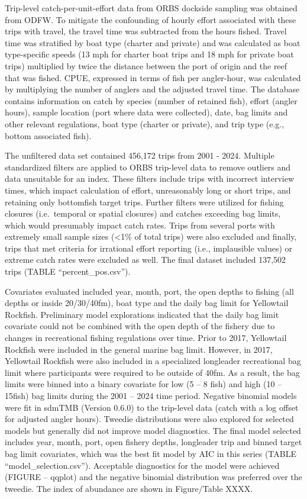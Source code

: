 \documentclass[
]{scrartcl}
\begin{document}
Trip-level catch-per-unit-effort data from ORBS dockside sampling was
obtained from ODFW. To mitigate the confounding of hourly effort
associated with these trips with travel, the travel time was subtracted
from the hours fished. Travel time was stratified by boat type (charter
and private) and was calculated as boat type-specific speeds (13 mph for
charter boat trips and 18 mph for private boat trips) multiplied by
twice the distance between the port of origin and the reef that was
fished. CPUE, expressed in terms of fish per angler-hour, was calculated
by multiplying the number of anglers and the adjusted travel time. The
database contains information on catch by species (number of retained
fish), effort (angler hours), sample location (port where data were
collected), date, bag limits and other relevant regulations, boat type
(charter or private), and trip type (e.g., bottom associated fish).

The unfiltered data set contained 456,172 trips from 2001 - 2024.
Multiple standardized filters are applied to ORBS trip-level data to
remove outliers and data unsuitable for an index. These filters include
trips with incorrect interview times, which impact calculation of
effort, unreasonably long or short trips, and retaining only bottomfish
target trips. Further filters were utilized for fishing closures
(i.e.~temporal or spatial closures) and catches exceeding bag limits,
which would presumably impact catch rates. Trips from several ports with
extremely small sample sizes (\textless1\% of total trips) were also
excluded and finally, trips that met criteria for irrational effort
reporting (i.e., implausible values) or extreme catch rates were
excluded as well. The final dataset included 137,502 trips (TABLE
``percent\_pos.csv'').

Covariates evaluated included year, month, port, the open depths to
fishing (all depths or inside 20/30/40fm), boat type and the daily bag
limit for Yellowtail Rockfish. Preliminary model explorations indicated
that the daily bag limit covariate could not be combined with the open
depth of the fishery due to changes in recreational fishing regulations
over time. Prior to 2017, Yellowtail Rockfish were included in the
general marine bag limit. However, in 2017, Yellowtail Rockfish were
also included in a specialized longleader recreational bag limit where
participants were required to be outside of 40fm. As a result, the bag
limits were binned into a binary covariate for low (5 -- 8 fish) and
high (10 -- 15fish) bag limits during the 2001 -- 2024 time period.
Negative binomial models were fit in sdmTMB (Version 0.6.0) to the
trip-level data (catch with a log offset for adjusted angler hours).
Tweedie distributions were also explored for selected models but
generally did not improve model diagnostics. The final model selected
includes year, month, port, open fishery depths, longleader trip and
binned target bag limit covariates, which was the best fit model by AIC
in this series (TABLE ``model\_selection.csv''). Acceptable diagnostics
for the model were achieved (FIGURE -- qqplot) and the negative binomial
distribution was preferred over the tweedie. The index of abundance are
shown in Figure/Table XXXX.
\end{document}
